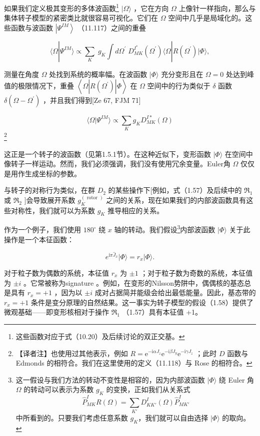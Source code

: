 如果我们定义极其变形的多体波函数\footnote{这些函数对应于式（10.20）及后续讨论的双正交基。}
$|\Omega\rangle$ ，它在方向 $\Omega$ 上像针一样指向，那么与集体转子模型的紧密类比就很容易可视化。它们在
$\Omega$ 空间中几乎是局域化的。这些函数与波函数 $\left|{\Psi}^{IM}\right\rangle $ （11.117）之间的重叠

\[
\langle\Omega|{\Psi}^{IM}\rangle\propto\mathop{\sum}\limits_{K}\;{g}_{K}\int d{\Omega}^{\prime}\;{D}^{{I}^{*}}_{MK}\left({\Omega}^{\prime}\right)\langle\Omega|R\left({\Omega}^{\prime}\right)|\Phi\rangle,\tag{11.121}
\]

测量在角度 $\Omega$ 处找到系统的概率幅。在波函数 $|\Phi\rangle$ 充分变形且在 $\Omega=0$
处达到峰值的极限情况下，重叠 $\left\langle {\Omega\left|{R\left({\Omega}^{\prime}\right)}\right|\Phi}\right\rangle $
在 $\Omega$ 空间中的行为类似于 $\delta$ 函数 $\delta\left({\Omega-{\Omega}^{\prime}}\right)$
，并且我们得到{[}Ze 67, FJM 71{]}

\[
\langle\Omega|\Psi^{IM}\rangle\propto\sum_{K}g_{K}D^{I*}_{MK}(\Omega)\tag{11.122}
\]
\footnote{【译者注】也使用过其他表示，例如 $R=\mathrm{e}^{-\mathrm{i}\alpha J_{z}}\mathrm{e}^{-\mathrm{i}\beta J_{y}}\mathrm{e}^{-\mathrm{i}\gamma J_{z}}$
；此时 $D$ 函数与 Edmonds \cite{Ed57} 的相符合。我们在这里使用的定义（11.118）与 Rose \cite{Ro57}
的相符合。}

这正是一个转子的波函数（见第1.5.1节）。在这种近似下，变形函数 $|\Phi\rangle$ 在空间中像转子一样运动。然而，我们必须强调，我们没有使用冗余变量。Euler角
$\Omega$ 仅仅是用作生成坐标的参数。

与转子的对称行为类似，在群 ${D}_{2}$ 的某些操作下{[}例如，式（1.57）及后续中的 ${\Re}_{1}$ 或 ${\Re}_{2}$
{]}会导致展开系数 ${g}^{\left(\text{ rotor }\right)}_{K}$ 之间的关系，现在如果我们的内部波函数具有这些对称性，我们就可以为系数
${g}_{K}$ 推导相应的关系。

作为一个例子，我们使用 ${180}^{\circ}$ 绕 $x$ 轴的转动。我们假设\footnote{这一假设与我们方法的转动不变性是相容的，因为内部波函数 $|\Phi\rangle$ 绕 Euler 角 $\Omega$ 的转动可以表示为系数
$g_{K}$ 的变换，正如我们从关系式
\[
\hat{P}^{I}_{MK}R(\Omega)=\sum_{K'}D^{I}_{KK'}(\Omega)\hat{P}^{I}_{MK'}\tag{11.123}
\]
中所看到的。只要我们考虑任意系数 $g_{K}$，我们就可以自由选择 $|\Phi\rangle$ 的取向。}内部波函数 $|\Phi\rangle$ 关于此操作是一个本征函数：

\[
{e}^{\mathrm{i}\pi{\widehat{J}}_{x}}|\Phi\rangle={r}_{x}|\Phi\rangle.\tag{11.124}
\]

对于粒子数为偶数的系统，本征值 ${r}_{x}$ 为 $\pm1$ ；对于粒子数为奇数的系统，本征值为 $\pm i$ 。它常被称为signature
\cite{Bo76b}。例如，在变形的Nilsson势阱中，偶偶核的基态总是具有 ${r}_{x}=+1$ ，因为以 $\pm i$
成对占据简并能级会给出最低能量。因此，基态带的 ${r}_{x}=+1$ 条件是变分原理的自然结果。这一事实为转子模型的假设（1.58）提供了微观基础——即变形核相对于操作
${\Re}_{1}$ （1.57）具有本征值 +1。

